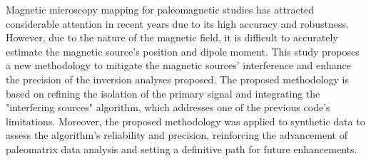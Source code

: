 Magnetic microscopy mapping for paleomagnetic studies has attracted considerable attention in recent years due to its high accuracy and robustness. However, due to the nature of the magnetic field, it is difficult to accurately estimate the magnetic source's position and dipole moment. This study proposes a new methodology to mitigate the magnetic sources' interference and enhance the precision of the inversion analyses proposed. The proposed methodology is based on refining the isolation of the primary signal and integrating the "interfering sources" algorithm, which addresses one of the previous code's limitations. Moreover, the proposed methodology was applied to synthetic data to assess the algorithm's reliability and precision, reinforcing the advancement of paleomatrix data analysis and setting a definitive path for future enhancements.